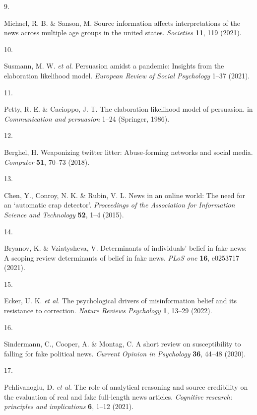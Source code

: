 \documentclass[
  man,floatsintext]{apa6}
\newlength{\cslhangindent}
\newlength{\csllabelwidth}
\newlength{\cslentryspacingunit} %
\newenvironment{CSLReferences}[2] %
 {%
  \setlength{\parindent}{0pt}
  \ifodd #1
  \let\oldpar\par
  \def\par{\hangindent=\cslhangindent\oldpar}
  \fi
  \setlength{\parskip}{#2\cslentryspacingunit}
 }%
 {}
\newcommand{\CSLLeftMargin}[1]{\parbox[t]{\csllabelwidth}{#1}}
\newcommand{\CSLRightInline}[1]{\parbox[t]{\linewidth - \csllabelwidth}{#1}\break}
\begin{document}
\begin{CSLReferences}{0}{0}
\leavevmode{}%
\CSLLeftMargin{9. }%
\CSLRightInline{Michael, R. B. \& Sanson, M. Source information affects interpretations of the news across multiple age groups in the united states. \emph{Societies} \textbf{11}, 119 (2021).}

\leavevmode{}%
\CSLLeftMargin{10. }%
\CSLRightInline{Susmann, M. W. \emph{et al.} Persuasion amidst a pandemic: Insights from the elaboration likelihood model. \emph{European Review of Social Psychology} 1--37 (2021).}

\leavevmode{}%
\CSLLeftMargin{11. }%
\CSLRightInline{Petty, R. E. \& Cacioppo, J. T. The elaboration likelihood model of persuasion. in \emph{Communication and persuasion} 1--24 (Springer, 1986).}

\leavevmode{}%
\CSLLeftMargin{12. }%
\CSLRightInline{Berghel, H. Weaponizing twitter litter: Abuse-forming networks and social media. \emph{Computer} \textbf{51}, 70--73 (2018).}

\leavevmode{}%
\CSLLeftMargin{13. }%
\CSLRightInline{Chen, Y., Conroy, N. K. \& Rubin, V. L. News in an online world: The need for an {`automatic crap detector'}. \emph{Proceedings of the Association for Information Science and Technology} \textbf{52}, 1--4 (2015).}

\leavevmode{}%
\CSLLeftMargin{14. }%
\CSLRightInline{Bryanov, K. \& Vziatysheva, V. Determinants of individuals' belief in fake news: A scoping review determinants of belief in fake news. \emph{PLoS one} \textbf{16}, e0253717 (2021).}

\leavevmode{}%
\CSLLeftMargin{15. }%
\CSLRightInline{Ecker, U. K. \emph{et al.} The psychological drivers of misinformation belief and its resistance to correction. \emph{Nature Reviews Psychology} \textbf{1}, 13--29 (2022).}

\leavevmode{}%
\CSLLeftMargin{16. }%
\CSLRightInline{Sindermann, C., Cooper, A. \& Montag, C. A short review on susceptibility to falling for fake political news. \emph{Current Opinion in Psychology} \textbf{36}, 44--48 (2020).}

\leavevmode{}%
\CSLLeftMargin{17. }%
\CSLRightInline{Pehlivanoglu, D. \emph{et al.} The role of analytical reasoning and source credibility on the evaluation of real and fake full-length news articles. \emph{Cognitive research: principles and implications} \textbf{6}, 1--12 (2021).}


\end{CSLReferences}
\end{document}
